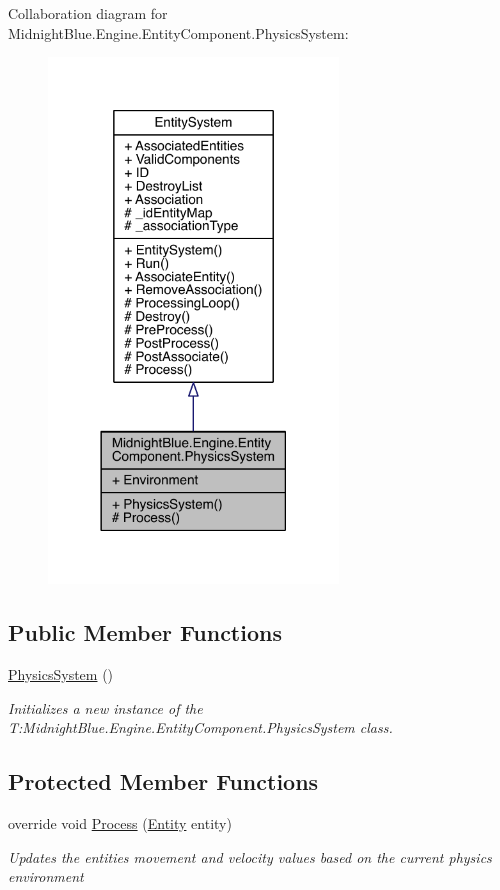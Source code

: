 Collaboration diagram for Midnight\+Blue.\+Engine.\+Entity\+Component.\+Physics\+System\+:
\nopagebreak
\begin{figure}[H]
\begin{center}
\leavevmode
\includegraphics[width=218pt]{class_midnight_blue_1_1_engine_1_1_entity_component_1_1_physics_system__coll__graph}
\end{center}
\end{figure}
\subsection*{Public Member Functions}
\begin{DoxyCompactItemize}
\item 
\hyperlink{class_midnight_blue_1_1_engine_1_1_entity_component_1_1_physics_system_a0e73869cd169b7c7da9874b02aa74df0}{Physics\+System} ()
\begin{DoxyCompactList}\small\item\em Initializes a new instance of the T\+:\+Midnight\+Blue.\+Engine.\+Entity\+Component.\+Physics\+System class. \end{DoxyCompactList}\end{DoxyCompactItemize}
\subsection*{Protected Member Functions}
\begin{DoxyCompactItemize}
\item 
override void \hyperlink{class_midnight_blue_1_1_engine_1_1_entity_component_1_1_physics_system_ab54f8db4bba2df1072b0fa3a3f4d47de}{Process} (\hyperlink{class_midnight_blue_1_1_engine_1_1_entity_component_1_1_entity}{Entity} entity)
\begin{DoxyCompactList}\small\item\em Updates the entities movement and velocity values based on the current physics environment \end{DoxyCompactList}\end{DoxyCompactItemize}
